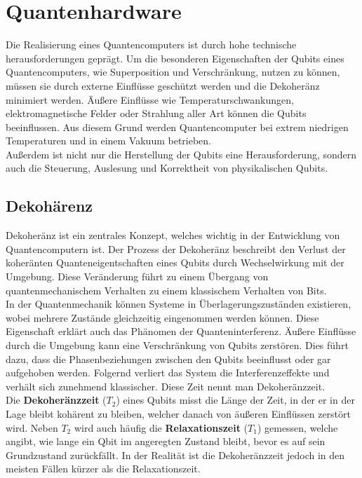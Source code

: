 \section{Quantenhardware}
\label{sec:quantenhardware}

Die Realisierung eines Quantencomputers ist durch hohe technische herausforderungen geprägt. Um die besonderen Eigenschaften der Qubits eines Quantencomputers, wie Superposition und Verschränkung, nutzen zu können, müssen sie durch externe Einflüsse geschützt werden und die Dekoheränz minimiert werden.
Äußere Einflüsse wie Temperaturschwankungen, elektromagnetische Felder oder Strahlung aller Art können die Qubits beeinflussen. Aus diesem Grund werden Quantencomputer bei extrem niedrigen Temperaturen und in einem Vakuum betrieben.\\

Außerdem ist nicht nur die Herstellung der Qubits eine Herausforderung, sondern auch die Steuerung, Auslesung und Korrektheit von physikalischen Qubits.

\subsection{Dekohärenz}
\label{sub:dekohaerenz}
Dekoheränz ist ein zentrales Konzept, welches wichtig in der Entwicklung von Quantencomputern ist. Der Prozess der Dekoheränz beschreibt den Verlust der koheränten Quanteneigentschaften eines Qubits durch Wechselwirkung mit der Umgebung.
Diese Veränderung führt zu einem Übergang von quantenmechanischem Verhalten zu einem klassischem Verhalten von Bits.\\

In der Quantenmechanik können Systeme in Überlagerungszuständen existieren, wobei mehrere Zustände gleichzeitig eingenommen werden können. Diese Eigenschaft erklärt auch das Phänomen der Quanteninterferenz.
Äußere Einflüsse durch die Umgebung kann eine Verschränkung von Qubits zerstören. Dies führt dazu, dass die Phasenbeziehungen zwischen den Qubits beeinflusst oder gar aufgehoben werden.
Folgernd verliert das System die Interferenzeffekte und verhält sich zunehmend klassischer. Diese Zeit nennt man Dekoheränzzeit.\\

Die \textbf{Dekoheränzzeit} ($T_2$) eines Qubits misst die Länge der Zeit, in der er in der Lage bleibt kohärent zu bleiben, welcher danach von äußeren Einflüssen zerstört wird.
Neben $T_2$ wird auch häufig die \textbf{Relaxationszeit} ($T_1$) gemessen, welche angibt, wie lange ein Qbit im angeregten Zustand bleibt, bevor es auf sein Grundzustand zurückfällt.
In der Realität ist die Dekoheränzzeit jedoch in den meisten Fällen kürzer als die Relaxationszeit.\\

